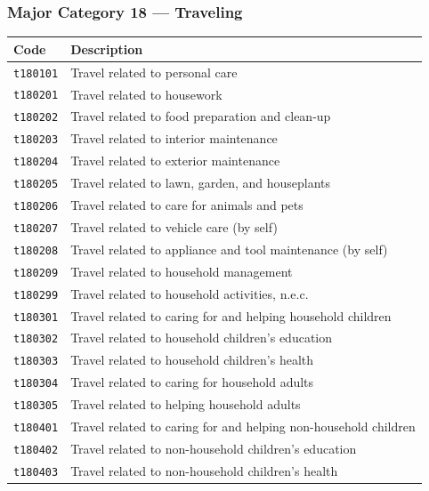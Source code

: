 \documentclass[11pt, a4paper]{article}
\begin{document}
\subsubsection*{Major Category 18 --- Traveling}
\begin{longtable}{L{3cm} L{13cm}}
\toprule \textbf{Code} & \textbf{Description} \\ \midrule \endhead
\bottomrule \endfoot
\texttt{t180101} & Travel related to personal care \\
 \texttt{t180201} & Travel related to housework \\
\texttt{t180202} & Travel related to food preparation and clean-up \\
 \texttt{t180203} & Travel related to interior maintenance \\
\texttt{t180204} & Travel related to exterior maintenance \\
 \texttt{t180205} & Travel related to lawn, garden, and houseplants \\
\texttt{t180206} & Travel related to care for animals and pets \\
 \texttt{t180207} & Travel related to vehicle care (by self) \\
\texttt{t180208} & Travel related to appliance and tool maintenance (by self) \\
 \texttt{t180209} & Travel related to household management \\
\texttt{t180299} & Travel related to household activities, n.e.c. \\
 \texttt{t180301} & Travel related to caring for and helping household children \\
\texttt{t180302} & Travel related to household children's education \\
 \texttt{t180303} & Travel related to household children's health \\
\texttt{t180304} & Travel related to caring for household adults \\
 \texttt{t180305} & Travel related to helping household adults \\
\texttt{t180401} & Travel related to caring for and helping non-household children \\
 \texttt{t180402} & Travel related to non-household children's education \\
\texttt{t180403} & Travel related to non-household children's health \\

\end{longtable}
\end{document}
